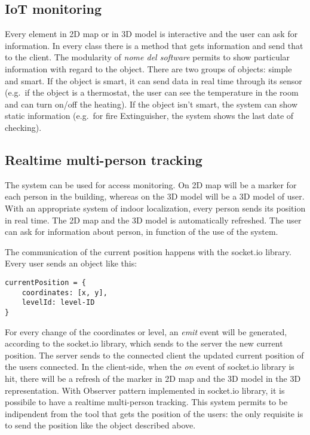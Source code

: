 \documentclass[]{article}
\begin{document}
\subsection{IoT monitoring}\label{iot-monitoring}

Every element in 2D map or in 3D model is interactive and the user can
ask for information. In every class there is a method that gets
information and send that to the client. The modularity of \emph{nome
del software} permits to show particular information with regard to the
object. There are two groups of objects: simple and smart. If the object
is smart, it can send data in real time through its sensor (e.g.~if the
object is a thermostat, the user can see the temperature in the room and
can turn on/off the heating). If the object isn't smart, the system can
show static information (e.g.~for fire Extinguisher, the system shows
the last date of checking).

\subsection{Realtime multi-person
tracking}\label{realtime-multi-person-tracking}

The system can be used for access monitoring. On 2D map will be a marker
for each person in the building, whereas on the 3D model will be a 3D
model of user. With an appropriate system of indoor localization, every
person sends its position in real time. The 2D map and the 3D model is
automatically refreshed. The user can ask for information about person,
in function of the use of the system.

The communication of the current position happens with the socket.io
library. Every user sends an object like this:

\begin{verbatim}
currentPosition = {
    coordinates: [x, y],
    levelId: level-ID  
}
\end{verbatim}

For every change of the coordinates or level, an \emph{emit} event will
be generated, according to the socket.io library, which sends to the
server the new current position. The server sends to the connected
client the updated current position of the users connected. In the
client-side, when the \emph{on} event of socket.io library is hit, there
will be a refresh of the marker in 2D map and the 3D model in the 3D
representation. With Observer pattern implemented in socket.io library,
it is possibile to have a realtime multi-person tracking. This system
permits to be indipendent from the tool that gets the position of the
users: the only requisite is to send the position like the object
described above.
\end{document}
